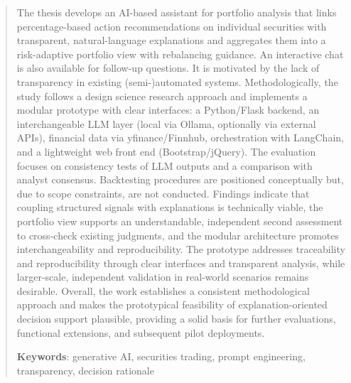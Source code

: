 \begin{abstract}
    The thesis develops an AI-based assistant for portfolio analysis that links percentage-based action recommendations on individual securities with transparent, natural-language explanations and aggregates them into a risk-adaptive portfolio view with rebalancing guidance.
    An interactive chat is also available for follow-up questions.
    It is motivated by the lack of transparency in existing (semi-)automated systems.
    Methodologically, the study follows a design science research approach and implements a modular prototype with clear interfaces: a Python/Flask backend, an interchangeable LLM layer (local via Ollama, optionally via external APIs), financial data via yfinance/Finnhub, orchestration with LangChain, and a lightweight web front end (Bootstrap/jQuery).
    The evaluation focuses on consistency tests of LLM outputs and a comparison with analyst consensus.
    Backtesting procedures are positioned conceptually but, due to scope constraints, are not conducted.
    Findings indicate that coupling structured signals with explanations is technically viable, the portfolio view supports an understandable, independent second assessment to cross-check existing judgments, and the modular architecture promotes interchangeability and reproducibility.
    The prototype addresses traceability and reproducibility through clear interfaces and transparent analysis, while larger-scale, independent validation in real-world scenarios remains desirable.
    Overall, the work establishes a consistent methodological approach and makes the prototypical feasibility of explanation-oriented decision support plausible, providing a solid basis for further evaluations, functional extensions, and subsequent pilot deployments.

    \textbf{Keywords}: generative AI, securities trading, prompt engineering, transparency, decision rationale

\end{abstract}

